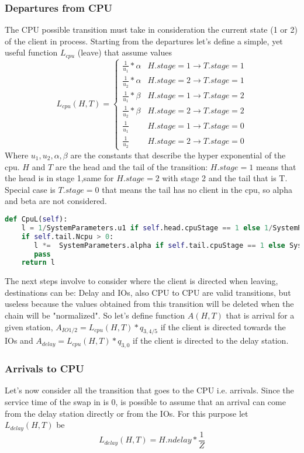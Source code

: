 \documentclass[12pt,a4paper]{article}
\begin{document}
\subsubsection{Departures from CPU}

The CPU possible transition must take in consideration the current state (1 or 2) of the client in process. Starting from the departures let's define a simple, yet useful function $L_{cpu}$ (leave) that assume values 
$$L_{cpu}(H,T)=
\begin{cases}
    \frac{1}{u_1}*\alpha &  H.stage=1 \rightarrow T.stage=1 \\
    \frac{1}{u_2}*\alpha & H.stage=2 \rightarrow T.stage=1\\
    \frac{1}{u_1}*\beta & H.stage=1 \rightarrow T.stage=2 \\
    \frac{1}{u_2}*\beta & H.stage=2 \rightarrow T.stage=2\\
    \frac{1}{u_1} & H.stage=1 \rightarrow T.stage=0\\
    \frac{1}{u_2} & H.stage=2 \rightarrow T.stage=0
\end{cases}
$$
Where $u_1,u_2,\alpha,\beta$ are the constants that describe the hyper exponential of the cpu. $H$ and $T$ are the head and the tail of the transition: $H.stage=1$ means that the head is in stage 1,same for $H.stage=2$ with stage 2 and the tail that is T. Special case is $T.stage=0$ that means the tail has no client in the cpu, so alpha and beta are not considered.  

\begin{lstlisting}[language=python]
def CpuL(self):
    l = 1/SystemParameters.u1 if self.head.cpuStage == 1 else 1/SystemParameters.u2
    if self.tail.Ncpu > 0:
       l *=  SystemParameters.alpha if self.tail.cpuStage == 1 else SystemParameters.beta
       pass
    return l
\end{lstlisting}

The next steps involve to consider where the client is directed when leaving, destinations can be: Delay and IOs, also CPU to CPU are valid transitions, but useless because the values obtained from this transition will be deleted when the chain will be "normalized". So let's define function $A(H,T)$ that is arrival for a given station, $A_{IO1/2}=L_{cpu}(H,T)*q_{3,4/5}$ if the client is directed towards the IOs and $A_{delay}=L_{cpu}(H,T)*q_{3,0}$ if the client is directed to the delay station. 


\subsubsection{Arrivals to CPU}
Let's now consider all the transition that goes to the CPU i.e. arrivals. Since the service time of the swap in is 0, is possible to assume that an arrival can come from the delay station directly or from the IOs. For this purpose let $L_{delay}(H,T)$ be 
$$
L_{delay}(H,T)= H.ndelay*\frac{1}{Z}
$$
\end{document}
